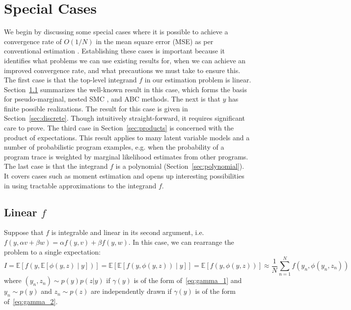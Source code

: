 
\section{Special Cases}
\label{sec:special_cases}

We begin by discussing some special cases where it is possible to achieve a
convergence rate of $O(1/N)$ in the mean square error (MSE) as per conventional
\mc estimation \citep{robert2004monte}.  
Establishing these cases is important because it identifies what problems we can use existing results for,
when we can achieve an improved convergence rate, and what precautions we must take to ensure this.
The first case is that the top-level integrand $f$ in our estimation problem is linear. 
Section~\ref{sec:linear_case} summarizes the well-known result in this case, which forms the basis for pseudo-marginal, 
nested SMC \citep{naessethLS2015nested}, and ABC methods. The next is that $y$ has finite possible realizations.
The result for this case is given in Section~\ref{sec:discrete}. Though intuitively straight-forward, it 
requires significant care to prove. The third case in Section~\ref{sec:products} is concerned with the product of expectations.
This result applies to many latent variable models and a number 
of probabilistic program examples, e.g. when the probability of a program trace
is weighted by marginal likelihood estimates from other programs.
The last case is that the integrand $f$ is a polynomial (Section~\ref{sec:polynomial}). It 
covers cases such as moment estimation and opens up interesting possibilities in using tractable 
approximations to the integrand $f$.

\subsection{Linear $f$}
\label{sec:linear_case}

Suppose that $f$ 
is integrable and linear in its second argument, i.e. $f(y,\alpha v + \beta w) = 
\alpha f(y,v)+ \beta f(y,w)$.
In this case, we can rearrange the problem to a single expectation:
\[
I
 = \mathbb{E}\left[f\left(y,\mathbb{E}\left[\phi(y,z)\middle|y\right]\right)\right]
= \mathbb{E}\left[ \mathbb{E}\left[f(y,\phi(y,z))\middle|y\right]\right] = \mathbb{E}\left[f(y,\phi(y,z))\right]
 \approx\frac{1}{N} \sum_{n=1}^{N} f(y_n,\phi(y_n,z_n))
\]
where $(y_n, z_n) \sim p(y)p(z|y)$ if $\gamma(y)$ is of the form of~\eqref{eq:gamma_1} and
$y_n \sim p(y)$ and $z_n \sim p(z)$ are independently drawn if $\gamma(y)$ is of the form of~\eqref{eq:gamma_2}.

